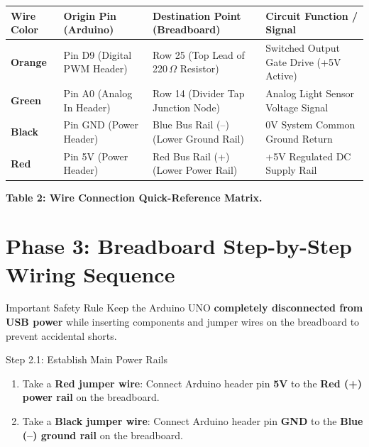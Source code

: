 \documentclass[12pt,a4paper]{article}
\begin{document}
\begin{center}
\footnotesize
\renewcommand{\arraystretch}{1.12}
\begin{tabularx}{\textwidth}{|l|>{\raggedright\arraybackslash}p{3.2cm}|>{\raggedright\arraybackslash}p{3.6cm}|X|}
\hline
\textbf{Wire Color} & \textbf{Origin Pin (Arduino)} & \textbf{Destination Point (Breadboard)} & \textbf{Circuit Function / Signal} \\
\hline
\textcolor{wireOrange}{\textbf{Orange}} & Pin D9 (Digital PWM Header) & Row 25 (Top Lead of 220\,$\Omega$ Resistor) & Switched Output Gate Drive (+5V Active) \\
\hline
\textcolor{wireGreen}{\textbf{Green}} & Pin A0 (Analog In Header) & Row 14 (Divider Tap Junction Node) & Analog Light Sensor Voltage Signal \\
\hline
\textbf{Black} & Pin GND (Power Header) & Blue Bus Rail (--) (Lower Ground Rail) & 0V System Common Ground Return \\
\hline
\textcolor{wireRed}{\textbf{Red}} & Pin 5V (Power Header) & Red Bus Rail (+) (Lower Power Rail) & +5V Regulated DC Supply Rail \\
\hline
\end{tabularx}
\vspace{0.15cm}
{\footnotesize\textbf{Table 2: Wire Connection Quick-Reference Matrix.}}
\end{center}

\newpage

\section*{Phase 3: Breadboard Step-by-Step Wiring Sequence}

\begin{notebox}{Important Safety Rule}
Keep the Arduino UNO \textbf{completely disconnected from USB power} while inserting components and jumper wires on the breadboard to prevent accidental shorts.
\end{notebox}

\begin{stepbox}{Step 2.1: Establish Main Power Rails}
\begin{enumerate}
    \item Take a \textbf{Red jumper wire}: Connect Arduino header pin \textbf{5V} to the \textbf{Red (+) power rail} on the breadboard.
    \item Take a \textbf{Black jumper wire}: Connect Arduino header pin \textbf{GND} to the \textbf{Blue (--) ground rail} on the breadboard.
\end{enumerate}
\end{stepbox}
\end{document}

